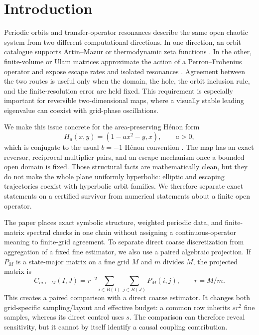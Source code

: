 \section{Introduction}

Periodic orbits and transfer-operator resonances describe the same open chaotic
system from two different computational directions.  In one direction, an
orbit catalogue supports Artin--Mazur or thermodynamic zeta functions
\citep{ArtinMazur1965,Ruelle1976Zeta,Ruelle1978Thermodynamic}.  In the other,
finite-volume or Ulam matrices approximate the action of a Perron--Frobenius
operator and expose escape rates and isolated resonances
\citep{Ulam1960,Keller1982,Froyland2007,Froyland1995}.  Agreement between the
two routes is useful only when the domain, the hole, the orbit inclusion rule,
and the finite-resolution error are held fixed.  This requirement is
especially important for reversible two-dimensional maps, where a visually
stable leading eigenvalue can coexist with grid-phase oscillations.

We make this issue concrete for the area-preserving H\'enon form
\begin{equation}
  H_a(x,y)=(1-a x^2-y,x), \qquad a>0,
  \label{eq:intro-map}
\end{equation}
which is conjugate to the usual $b=-1$ H\'enon convention
\citep{Henon1976,Wiggins1990}.  The map has an exact reversor, reciprocal
multiplier pairs, and an escape mechanism once a bounded open domain is fixed.
Those structural facts are mathematically clean, but they do not make the
whole plane uniformly hyperbolic: elliptic and escaping trajectories coexist
with hyperbolic orbit families.  We therefore separate exact statements on a
certified survivor from numerical statements about a finite open operator.

The paper places exact symbolic structure, weighted periodic data, and
finite-matrix spectral checks in one chain without assigning a
continuous-operator meaning to finite-grid agreement.  To separate direct
coarse discretization from aggregation of a fixed fine estimator, we also use
a paired algebraic projection.  If $P_M$ is a state-major matrix on a fine
grid $M$ and $m$ divides $M$, the projected matrix is
\begin{equation}
 C_{m\leftarrow M}(I,J)
 =r^{-2}\sum_{i\in B(I)}\sum_{j\in B(J)}P_M(i,j),
 \qquad r=M/m.
 \label{eq:intro-coarsen}
\end{equation}
This creates a paired comparison with a direct coarse estimator.  It changes
both grid-specific sampling/layout and effective budget: a common row inherits
$s r^2$ fine samples, whereas its direct control uses $s$.  The comparison can
therefore reveal sensitivity, but it cannot by itself identify a causal
coupling contribution.

